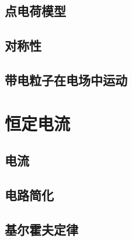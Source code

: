 \documentclass[cn,blue,11pt,normal]{elegantnote}
\begin{document}
\subsection{点电荷模型}
\begin{proset}
	
\end{proset}
\begin{proset}
	
\end{proset}

\subsection{对称性}
\begin{proset}
	
\end{proset}
\begin{proset}
	
\end{proset}


\subsection{带电粒子在电场中运动}
\begin{proset}
	
\end{proset}
\begin{proset}
	
\end{proset}


\newpage
\section{恒定电流}

\subsection{电流}
\begin{proset}
	
\end{proset}

\subsection{电路简化}
\begin{proset}
	
\end{proset}

\subsection{基尔霍夫定律}
\begin{proset}
	
\end{proset}
\end{document}
